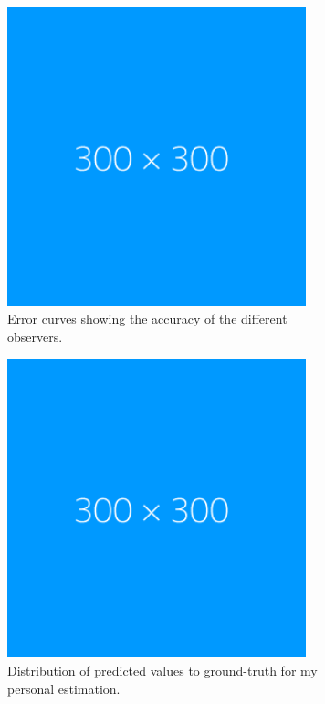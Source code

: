 \documentclass[a4paper,twoside,11pt,openright,table,draft]{article} %
\begin{document}
\begin{figure}[!htb]
	\centering
	\begin{subfigure}{0.49\textwidth}
	\captionsetup{width=.9\linewidth}
		\centering
		\includegraphics[width=0.95\textwidth]{fig/dummy.png}
		\caption{Error curves showing the accuracy of the different observers.}
	\end{subfigure}
	\begin{subfigure}{0.49\textwidth}
		\captionsetup{width=.9\linewidth}
		\centering
		\includegraphics[width=0.95\textwidth]{fig/dummy.png}
		\caption{Distribution of predicted values to ground-truth for my personal estimation.}
	\end{subfigure}
	\caption[Human estimation of defoliation]{\label{fig:Ur_human_cum}}
\end{figure}
\end{document}
